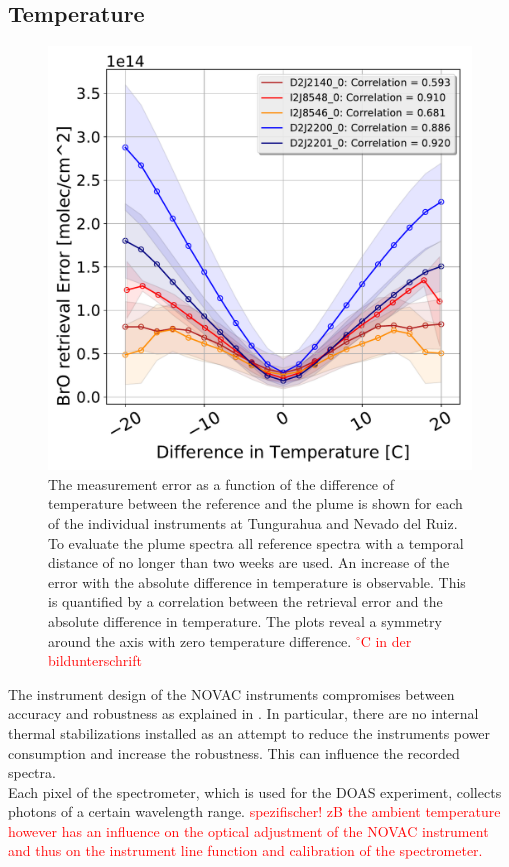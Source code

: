 \subsection{Temperature}
\begin{figure}
	\centering
	\includegraphics[width=0.7\linewidth]{Bilder/DiffTempallInstruments}
	\caption{The  measurement error as a function of the difference of temperature between the reference and the plume is shown for each of the individual instruments at Tungurahua and Nevado del Ruiz. To evaluate the plume spectra all reference spectra with a temporal distance of no longer than two weeks are used. An increase of the  error with the absolute difference in temperature is observable. This is quantified by a correlation between the  retrieval error and the absolute difference in temperature. The plots reveal a symmetry around the axis with zero temperature difference. \textcolor{red}{$^{\circ}$C in der bildunterschrift}}
	\label{fig:difftemp}
\end{figure}
The instrument design of the NOVAC instruments compromises between accuracy and robustness as explained in . In particular, there are no internal thermal stabilizations installed as an attempt to reduce the instruments power consumption and increase the robustness. This can influence the recorded spectra.\\	
Each pixel of the spectrometer, which is used for the DOAS experiment, collects photons of a certain wavelength range. \textcolor{red}{spezifischer! zB the ambient temperature however has an influence on the optical adjustment of the NOVAC instrument and thus on the instrument line function and calibration of the spectrometer.}\\
